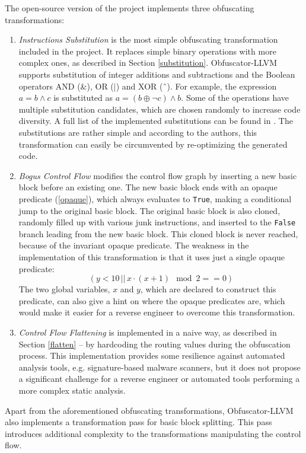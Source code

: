 \documentclass[
  digital, %
  table,   %
  twoside, %
  nolof,     %
  nolot,     %
]{fithesis3}
\theoremstyle{definition}
\begin{document}
The open-source version of the project implements three obfuscating transformations:
\begin{enumerate}
    \item \textit{Instructions Substitution} is the most simple obfuscating transformation included in the project. It replaces simple binary operations with more complex ones, as described in Section \ref{substitution}. Obfuscator-LLVM supports substitution of integer additions and subtractions and the Boolean operators  AND  ($\&$),  OR  ($|$)  and  XOR  (ˆ). For example, the expression $a = b \wedge c$ is substituted as $a = (b \oplus \neg c) \wedge b$. Some of the operations have multiple substitution candidates, which are chosen randomly to increase code diversity. A full list of the implemented substitutions can be found in \cite{obfuscator-llvm}. The substitutions are rather simple and according to the authors, this transformation  can easily  be  circumvented  by  re-optimizing  the  generated  code.
    \item \textit{Bogus Control Flow} modifies the control flow graph by inserting a new basic block before an existing one. The new basic block ends with an opaque predicate (\ref{opaque}), which always evaluates to \texttt{True}, making a conditional jump to the original basic block. The original basic block is also cloned, randomly filled up with various junk instructions, and inserted to the \texttt{False} branch leading from the new basic block. This cloned block is never reached, because of the invariant opaque predicate. The weakness in the implementation of this transformation is that it uses just a single opaque predicate: $$(y < 10\, ||\, x \cdot (x + 1) \mod 2 == 0)$$ The two global variables, $x$ and $y$, which are declared to construct this predicate, can also give a hint on where the opaque predicates are, which would make it easier for a reverse engineer to overcome this transformation. 
    \item \textit{Control Flow Flattening} is implemented in a naive way, as described in Section \ref{flatten} -- by hardcoding the routing values during the obfuscation process. This implementation provides some resilience against automated analysis tools, e.g. signature-based malware scanners, but it does not propose a significant challenge for a reverse engineer or automated tools performing a more complex static analysis.
\end{enumerate}

Apart from the aforementioned obfuscating transformations, Obfuscator-LLVM also implements a transformation pass for basic block splitting. This pass introduces additional complexity to the transformations manipulating the control flow. 
\end{document}
